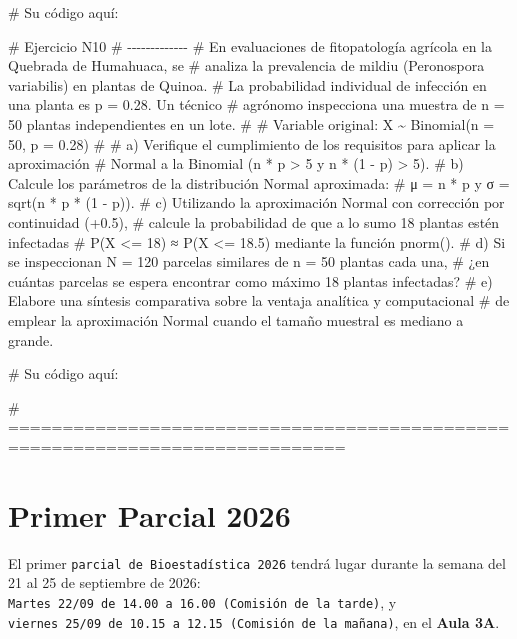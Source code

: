 \documentclass[
  spanish,
  letterpaper,
  DIV=11,
  numbers=noendperiod]{scrreprt}
\newenvironment{Shaded}{\begin{snugshade}}{\end{snugshade}}
\newcommand{\CommentTok}[1]{\textcolor[rgb]{0.37,0.37,0.37}{#1}}
\begin{document}
\begin{Shaded}
\begin{Highlighting}[]
\CommentTok{\# Su código aquí:}


\CommentTok{\# Ejercicio N10}
\CommentTok{\# {-}{-}{-}{-}{-}{-}{-}{-}{-}{-}{-}{-}{-}}
\CommentTok{\# En evaluaciones de fitopatología agrícola en la Quebrada de Humahuaca, se}
\CommentTok{\# analiza la prevalencia de mildiu (Peronospora variabilis) en plantas de Quinoa.}
\CommentTok{\# La probabilidad individual de infección en una planta es p = 0.28. Un técnico}
\CommentTok{\# agrónomo inspecciona una muestra de n = 50 plantas independientes en un lote.}
\CommentTok{\#}
\CommentTok{\#  Variable original: X \textasciitilde{} Binomial(n = 50, p = 0.28)}
\CommentTok{\#}
\CommentTok{\# a) Verifique el cumplimiento de los requisitos para aplicar la aproximación}
\CommentTok{\#    Normal a la Binomial (n * p \textgreater{} 5 y n * (1 {-} p) \textgreater{} 5).}
\CommentTok{\# b) Calcule los parámetros de la distribución Normal aproximada:}
\CommentTok{\#    μ = n * p   y   σ = sqrt(n * p * (1 {-} p)).}
\CommentTok{\# c) Utilizando la aproximación Normal con corrección por continuidad (+0.5),}
\CommentTok{\#    calcule la probabilidad de que a lo sumo 18 plantas estén infectadas}
\CommentTok{\#    P(X \textless{}= 18) ≈ P(X\textquotesingle{} \textless{}= 18.5) mediante la función pnorm().}
\CommentTok{\# d) Si se inspeccionan N = 120 parcelas similares de n = 50 plantas cada una,}
\CommentTok{\#    ¿en cuántas parcelas se espera encontrar como máximo 18 plantas infectadas?}
\CommentTok{\# e) Elabore una síntesis comparativa sobre la ventaja analítica y computacional}
\CommentTok{\#    de emplear la aproximación Normal cuando el tamaño muestral es mediano a grande.}

\CommentTok{\# Su código aquí:}


\CommentTok{\# =============================================================================}
\end{Highlighting}
\end{Shaded}


\chapter*{Primer Parcial \textbar{} 2026}\label{primer-parcial-2026}


El primer \texttt{parcial\ de\ Bioestadística\ 2026} tendrá lugar
durante la semana del 21 al 25 de septiembre de 2026:
\texttt{Martes\ 22/09\ de\ 14.00\ a\ 16.00\ (Comisión\ de\ la\ tarde)},
y
\texttt{viernes\ 25/09\ de\ 10.15\ a\ 12.15\ (Comisión\ de\ la\ mañana)},
en el \textbf{Aula 3A}.
\end{document}
